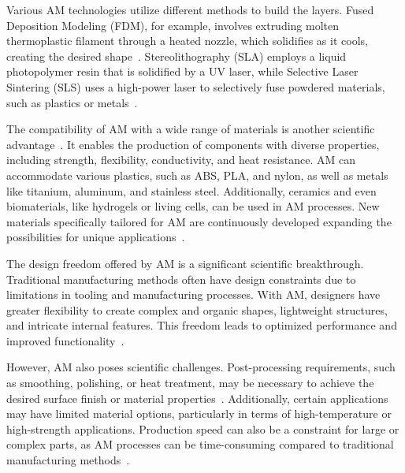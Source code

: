 Various AM technologies utilize different methods to build the layers. Fused Deposition Modeling (FDM), for example, involves extruding molten thermoplastic filament through a heated nozzle, which solidifies as it cools, creating the desired shape~\cite{Wickramasinghe.2020}. Stereolithography (SLA) employs a liquid photopolymer resin that is solidified by a UV laser, while Selective Laser Sintering (SLS) uses a high-power laser to selectively fuse powdered materials, such as plastics or metals~\cite{Wang.2016, Meier.2017}.

The compatibility of AM with a wide range of materials is another scientific advantage~\cite{Bose.2018}. It enables the production of components with diverse properties, including strength, flexibility, conductivity, and heat resistance. AM can accommodate various plastics, such as ABS, PLA, and nylon, as well as metals like titanium, aluminum, and stainless steel. Additionally, ceramics and even biomaterials, like hydrogels or living cells, can be used in AM processes. New materials specifically tailored for AM are continuously developed  expanding the possibilities for unique applications~\cite{Attaran.2017}.

The design freedom offered by AM is a significant scientific breakthrough. Traditional manufacturing methods often have design constraints due to limitations in tooling and manufacturing processes. With AM, designers have greater flexibility to create complex and organic shapes, lightweight structures, and intricate internal features. This freedom leads to optimized performance and improved functionality~\cite{Plocher.2019}.

However, AM also poses scientific challenges. Post-processing requirements, such as smoothing, polishing, or heat treatment, may be necessary to achieve the desired surface finish or material properties~\cite{Jandyal.2022}. Additionally, certain applications may have limited material options, particularly in terms of high-temperature or high-strength applications. Production speed can also be a constraint for large or complex parts, as AM processes can be time-consuming compared to traditional manufacturing methods~\cite{Dilberoglu.2017}.


